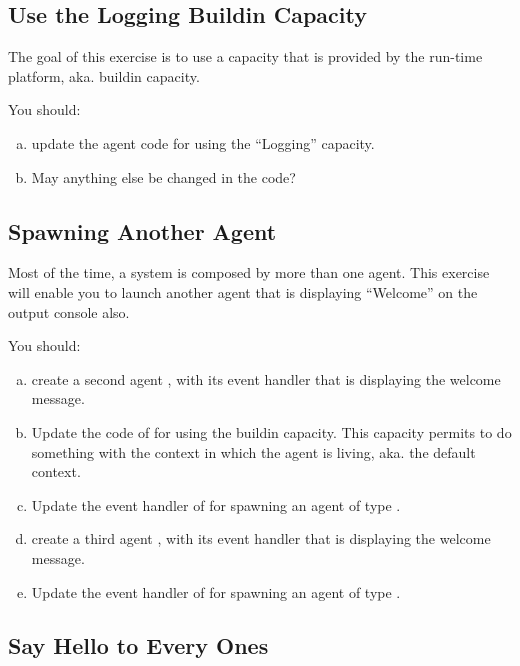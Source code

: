 \documentclass[english]{utbmciadreport}
\begin{document}

\subsection{Use the Logging Buildin Capacity}

The goal of this exercise is to use a capacity that is provided by the run-time platform, aka. buildin capacity.

You should:
\begin{enumerate}[a)]
\item update the agent code for using the ``Logging'' capacity.
\item May anything else be changed in the code?
\end{enumerate}

\subsection{Spawning Another Agent}

Most of the time, a system is composed by more than one agent. This exercise will enable you to launch another agent that is displaying ``Welcome'' on the output console also.

You should:
\begin{enumerate}[a)]
\item create a second agent , with its  event handler that is displaying the welcome message.
\item Update the code of  for using the  buildin capacity. This capacity permits to do something with the context in which the agent is living, aka. the default context.
\item Update the  event handler of  for spawning an agent of type .
\item create a third agent , with its  event handler that is displaying the welcome message.
\item Update the  event handler of  for spawning an agent of type .
\end{enumerate}

\subsection{Say Hello to Every Ones}
\end{document}
